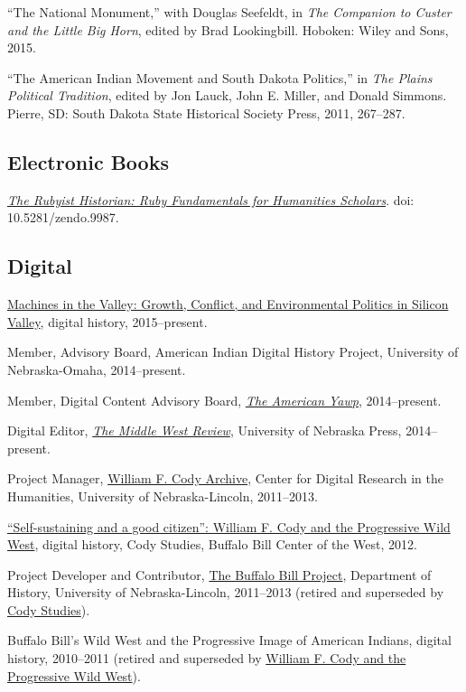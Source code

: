 ``The National Monument,'' with Douglas Seefeldt, in \emph{The Companion
to Custer and the Little Big Horn}, edited by Brad Lookingbill. Hoboken:
Wiley and Sons, 2015.

``The American Indian Movement and South Dakota Politics,'' in \emph{The
Plains Political Tradition}, edited by Jon Lauck, John E. Miller, and
Donald Simmons. Pierre, SD: South Dakota State Historical Society Press,
2011, 267--287.

\subsection{Electronic Books}\label{electronic-books}

\emph{\href{http://hepplerj.github.io/rubyist-historian/}{The Rubyist
Historian: Ruby Fundamentals for Humanities Scholars}}. doi:
10.5281/zendo.9987.

\subsection{Digital}\label{digital}

\href{http://dissertation.jasonheppler.org}{Machines in the Valley:
Growth, Conflict, and Environmental Politics in Silicon Valley}, digital
history, 2015--present.

Member, Advisory Board, American Indian Digital History Project,
University of Nebraska-Omaha, 2014--present.

Member, Digital Content Advisory Board,
\emph{\href{http://www.americanyawp.com/}{The American Yawp}},
2014--present.

Digital Editor, \emph{\href{https://uimiddle.wordpress.com/}{The Middle
West Review}}, University of Nebraska Press, 2014--present.

Project Manager, \href{http://codyarchive.org/}{William F. Cody
Archive}, Center for Digital Research in the Humanities, University of
Nebraska-Lincoln, 2011--2013.

\href{http://www.codystudies.org/showindians/}{``Self-sustaining and a
good citizen'': William F. Cody and the Progressive Wild West}, digital
history, Cody Studies, Buffalo Bill Center of the West, 2012.

Project Developer and Contributor,
\href{http://buffalobillproject.unl.edu/}{The Buffalo Bill Project},
Department of History, University of Nebraska-Lincoln, 2011--2013
(retired and superseded by \href{http://www.codystudies.org/}{Cody
Studies}).

Buffalo Bill's Wild West and the Progressive Image of American Indians,
digital history, 2010--2011 (retired and superseded by
\href{http://www.codystudies.org/showindians/}{William F. Cody and the
Progressive Wild West}).

